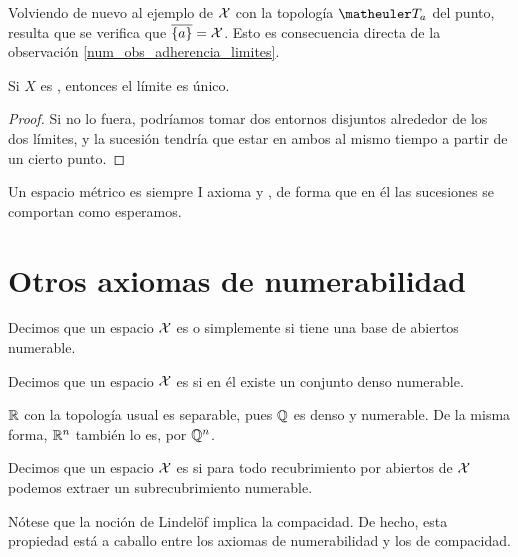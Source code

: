 \begin{exa}
	Volviendo de nuevo al ejemplo de $\mathcal{X}$ con la topología $\T_a$ del punto, resulta que se verifica que $\overline{\{a\}}=\mathcal{X}$. Esto es consecuencia directa de la observación \ref{num_obs_adherencia_limites}.
\end{exa}

\begin{prop}
	Si $X$ es \hausdorff, entonces el límite es único.
	
	\begin{proof}
		Si no lo fuera, podríamos tomar dos entornos disjuntos alrededor de los dos límites, y la sucesión tendría que estar en ambos al mismo tiempo a partir de un cierto punto.
	\end{proof}
\end{prop}

\begin{obs}
	Un espacio métrico es siempre I axioma y \hausdorff, de forma que en él las sucesiones se comportan como esperamos.
\end{obs}

\section{Otros axiomas de numerabilidad}

\begin{defi}
	Decimos que un espacio $\mathcal{X}$ es  o simplemente  si tiene una base de abiertos numerable.
\end{defi}

\begin{defi}[Separable]
	Decimos que un espacio $\mathcal{X}$ es  si en él existe un conjunto denso numerable.
\end{defi}

\begin{exa}
	$\mathbb{R}$ con la topología usual es separable, pues $\mathbb{Q}$ es denso y numerable. De la misma forma, $\mathbb{R}^n$ también lo es, por $\mathbb{Q}^n$. 
\end{exa}

\begin{defi}[Lindelöf]
	\label{lindel}
	Decimos que un espacio $\mathcal{X}$ es  si para todo recubrimiento por abiertos de $\mathcal{X}$ podemos extraer un subrecubrimiento numerable.
\end{defi}

\begin{obs}
	Nótese que la noción de Lindelöf implica la compacidad. De hecho, esta propiedad está a caballo entre los axiomas de numerabilidad y los de compacidad.
\end{obs}

